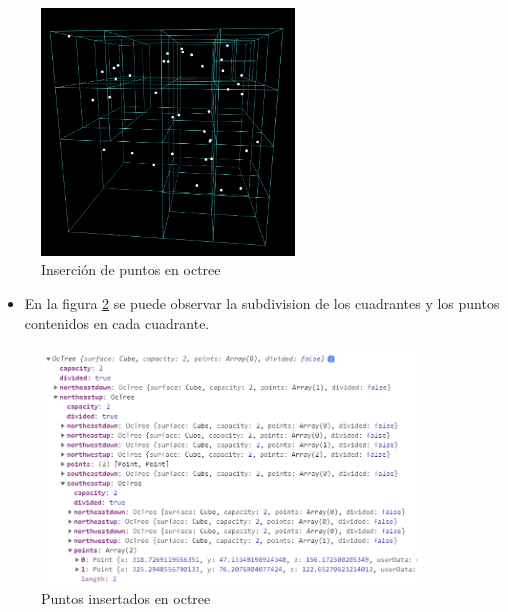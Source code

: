 \documentclass{article}
\begin{document}
\begin{figure}[h!]
\centering
\includegraphics[width=0.6\textwidth]{img/octree_insert.png}
\caption{Inserción de puntos en octree}
\label{fig:octree_insert}
\end{figure}
\clearpage
\begin{itemize}
\item En la figura \ref{fig:octree_insert_data} se puede observar la subdivision de los cuadrantes y los puntos contenidos en cada cuadrante.
\end{itemize}

\begin{figure}[h!]
\centering
\includegraphics[width=0.9\textwidth]{img/octree_insert_data.png}
\caption{Puntos insertados en octree}
\label{fig:octree_insert_data}
\end{figure}
  
\end{document}
